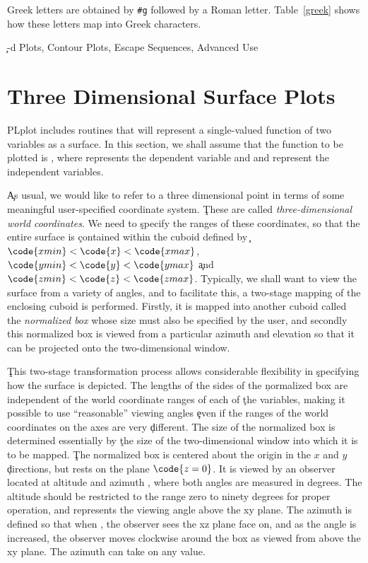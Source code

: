 Greek letters are obtained by \verb+#g+ followed by a Roman letter.
Table~\ref{greek} shows how these letters map into Greek
characters.
{}

\c %

-d Plots, Contour Plots, Escape Sequences, Advanced Use
\section{Three Dimensional Surface Plots}

PLplot includes routines that will represent a single-valued function of
two variables as a surface.  In this section, we shall assume that the
function to be plotted is , where  represents the
dependent variable and  and  represent the independent
variables.

\c As usual, we would like to refer to a three dimensional point  in terms of some meaningful user-specified coordinate system.
\c These are called \emph{three-dimensional world coordinates}.  We need to
\c specify the ranges of these coordinates, so that the entire surface is
\c contained within the cuboid defined by
\c $\code{xmin}<\code{x}<\code{xmax}$, $\code{ymin}<\code{y}<\code{ymax}$
\c and $\code{zmin}<\code{z}<\code{zmax}$.  Typically, we shall want to
view the surface from a variety of angles, and to facilitate this, a
two-stage mapping of the enclosing cuboid is performed.  Firstly, it is
mapped into another cuboid called the \emph{normalized box} whose size
must also be specified by the user, and secondly this normalized box is
viewed from a particular azimuth and elevation so that it can be
projected onto the two-dimensional window.

\c This two-stage transformation process allows considerable flexibility in
\c specifying how the surface is depicted.  The lengths of the sides of the
\c normalized box are independent of the world coordinate ranges of each of
\c the variables, making it possible to use ``reasonable'' viewing angles
\c even if the ranges of the world coordinates on the axes are very
\c different.  The size of the normalized box is determined essentially by
\c the size of the two-dimensional window into which it is to be mapped.
\c The normalized box is centered about the origin in the $x$ and $y$
\c directions, but rests on the plane $\code{z = 0}$.  It is viewed by an
observer located at altitude  and azimuth , where
both angles are measured in degrees.  The altitude should be restricted
to the range zero to ninety degrees for proper operation, and represents
the viewing angle above the xy plane.  The azimuth is defined so that
when , the observer sees the xz plane face on, and as the
angle is increased, the observer moves clockwise around the box as
viewed from above the xy plane.  The azimuth can take on any
value. 

